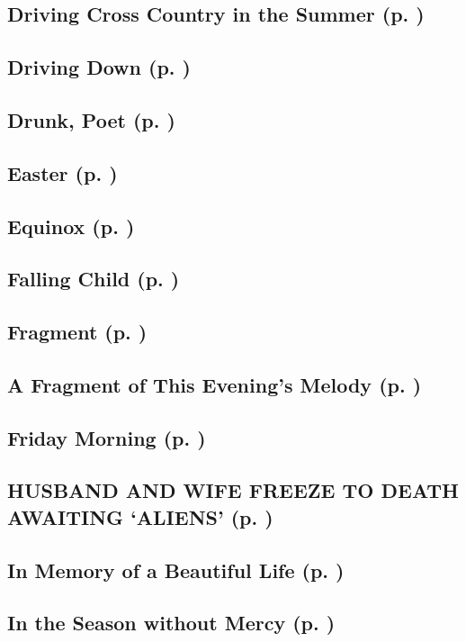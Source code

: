 \subsection*{Driving Cross Country in the Summer (p. \pageref{ch:driving_cross_country})}
\subsection*{Driving Down (p. \pageref{ch:driving_down})}
\subsection*{Drunk, Poet (p. \pageref{ch:drunk_poet})}
\subsection*{Easter (p. \pageref{ch:easter})}
\subsection*{Equinox (p. \pageref{ch:equinox})}
\subsection*{Falling Child (p. \pageref{ch:falling_child})}
\subsection*{Fragment (p. \pageref{ch:fragment})}
\subsection*{A Fragment of This Evening's Melody (p. \pageref{ch:a_fragment})}
\subsection*{Friday Morning (p. \pageref{ch:friday_morning})}
\subsection*{HUSBAND AND WIFE FREEZE TO DEATH AWAITING `ALIENS' (p. \pageref{ch:husband_and_wife_freeze})}
\subsection*{In Memory of a Beautiful Life (p. \pageref{ch:in_memory_of_a_beautiful})}
\subsection*{In the Season without Mercy (p. \pageref{ch:in_the_season_without_mercy})}
